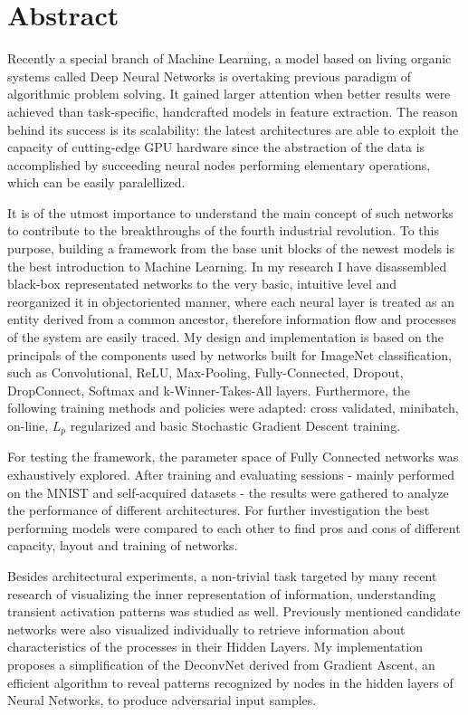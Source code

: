 \chapter*{Abstract}
Recently a special branch of Machine Learning, a model based on living organic systems called Deep Neural Networks is overtaking previous paradigm of algorithmic problem solving. 
It gained larger attention when better results were achieved than task-specific, handcrafted models in feature extraction. 
The reason behind its success is its scalability: the latest architectures are able to exploit the capacity of cutting-edge GPU hardware since the abstraction of the data is accomplished by succeeding neural nodes performing elementary operations, which can be easily paralellized.

It is of the utmost importance to understand the main concept of such networks to contribute to the breakthroughs of the fourth industrial revolution. 
To this purpose, building a framework from the base unit blocks of the newest models is the best introduction to Machine Learning. 
In my research I have disassembled black-box representated networks to the very basic, intuitive level and reorganized it in objectoriented manner, where each neural layer is treated as an entity derived from a common ancestor, therefore information flow and processes of the system are easily traced. 
My design and implementation is based on the principals of the components used by networks built for ImageNet classification, such as Convolutional, ReLU, Max-Pooling, Fully-Connected, Dropout, DropConnect, Softmax and k-Winner-Takes-All layers.
Furthermore, the following training methods and policies were adapted: cross validated, minibatch, on-line, $L_p$ regularized and basic Stochastic Gradient Descent training.

For testing the framework, the parameter space of Fully Connected networks was exhaustively explored. 
After training and evaluating sessions - mainly performed on the MNIST and self-acquired datasets - the results were gathered to analyze the performance of different architectures. 
For further investigation the best performing models  were compared to each other to find pros and cons of different capacity, layout and training of networks.

Besides architectural experiments, a non-trivial task targeted by many recent research of visualizing the inner representation of information, understanding transient activation patterns was studied as well.
Previously mentioned candidate networks were also visualized individually to retrieve information about characteristics of the processes in their Hidden Layers.
My implementation proposes a simplification of the DeconvNet derived from Gradient Ascent, an efficient algorithm to reveal patterns recognized by nodes in the hidden layers of Neural Networks, to produce adversarial input samples.